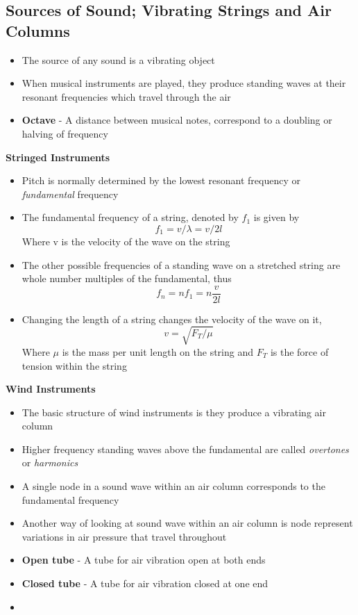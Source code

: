 \subsection{Sources of Sound; Vibrating Strings and Air Columns}
\begin{itemize}
    \item The source of any sound is a vibrating object
    \item When musical instruments are played, they produce standing waves at their resonant frequencies which travel through the air
    \item \textbf{Octave} - A distance between musical notes, correspond to a doubling or halving of frequency
\end{itemize}

\textbf{Stringed Instruments}
\begin{itemize}
    \item Pitch is normally determined by the lowest resonant frequency or \emph{fundamental} frequency
    \item The fundamental frequency of a string, denoted by \(f_1\) is given by \[f_1=v/\lambda=v/2l\] Where v is the velocity of the wave on the string
    \item The other possible frequencies of a standing wave on a stretched string are whole number multiples of the fundamental, thus \[f_n=nf_1=n\frac{v}{2l}\]
    \item Changing the length of a string changes the velocity of the wave on it, \[v=\sqrt{F_T/\mu}\] Where \(\mu\) is the mass per unit length on the string and \(F_T\) is the force of tension within the string
\end{itemize}

\textbf{Wind Instruments}
\begin{itemize}
    \item The basic structure of wind instruments is they produce a vibrating air column
    \item Higher frequency standing waves above the fundamental are called \emph{overtones} or \emph{harmonics}
    \item A single node in a sound wave within an air column corresponds to the fundamental frequency
    \item Another way of looking at sound wave within an air column is node represent variations in air pressure that travel throughout
    \item \textbf{Open tube} - A tube for air vibration open at both ends
    \item \textbf{Closed tube} - A tube for air vibration closed at one end
    \item 
\end{itemize}

